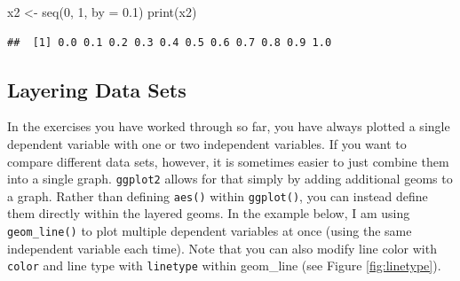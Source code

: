 \documentclass[
]{book}
\newenvironment{Shaded}{\begin{snugshade}}{\end{snugshade}}
\newcommand{\AttributeTok}[1]{\textcolor[rgb]{0.77,0.63,0.00}{#1}}
\newcommand{\DecValTok}[1]{\textcolor[rgb]{0.00,0.00,0.81}{#1}}
\newcommand{\FloatTok}[1]{\textcolor[rgb]{0.00,0.00,0.81}{#1}}
\newcommand{\FunctionTok}[1]{\textcolor[rgb]{0.00,0.00,0.00}{#1}}
\newcommand{\NormalTok}[1]{#1}
\newcommand{\OtherTok}[1]{\textcolor[rgb]{0.56,0.35,0.01}{#1}}
\begin{document}
\begin{Shaded}
\begin{Highlighting}[]
\NormalTok{x2 }\OtherTok{\textless{}{-}} \FunctionTok{seq}\NormalTok{(}\DecValTok{0}\NormalTok{, }\DecValTok{1}\NormalTok{, }\AttributeTok{by =} \FloatTok{0.1}\NormalTok{)}
\FunctionTok{print}\NormalTok{(x2)}
\end{Highlighting}
\end{Shaded}

\begin{verbatim}
##  [1] 0.0 0.1 0.2 0.3 0.4 0.5 0.6 0.7 0.8 0.9 1.0
\end{verbatim}

\hypertarget{layering-data-sets}{%
\subsection{Layering Data Sets}\label{layering-data-sets}}

In the exercises you have worked through so far, you have always plotted a single dependent variable with one or two independent variables. If you want to compare different data sets, however, it is sometimes easier to just combine them into a single graph. \texttt{ggplot2} allows for that simply by adding additional geoms to a graph. Rather than defining \texttt{aes()} within \texttt{ggplot()}, you can instead define them directly within the layered geoms. In the example below, I am using \texttt{geom\_line()} to plot multiple dependent variables at once (using the same independent variable each time). Note that you can also modify line color with \texttt{color} and line type with \texttt{linetype} within geom\_line (see Figure \ref{fig:linetype}).
\end{document}
